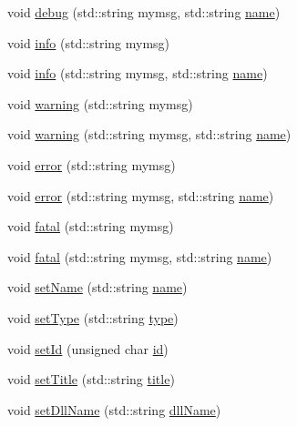 \begin{DoxyCompactItemize}
\item 
void \hyperlink{classObject_a6c9a0397ca804e04d675ed05683f5420}{debug} (std\+::string mymsg, std\+::string \hyperlink{classObject_a300f4c05dd468c7bb8b3c968868443c1}{name})
\item 
void \hyperlink{classObject_a644fd329ea4cb85f54fa6846484b84a8}{info} (std\+::string mymsg)
\item 
void \hyperlink{classObject_a1ca123253dfd30fc28b156f521dcbdae}{info} (std\+::string mymsg, std\+::string \hyperlink{classObject_a300f4c05dd468c7bb8b3c968868443c1}{name})
\item 
void \hyperlink{classObject_a65cd4fda577711660821fd2cd5a3b4c9}{warning} (std\+::string mymsg)
\item 
void \hyperlink{classObject_a11f101db4dd73d9391b0231818881d86}{warning} (std\+::string mymsg, std\+::string \hyperlink{classObject_a300f4c05dd468c7bb8b3c968868443c1}{name})
\item 
void \hyperlink{classObject_a204a95f57818c0f811933917a30eff45}{error} (std\+::string mymsg)
\item 
void \hyperlink{classObject_ad7f6c457733082efa2f9ff5f5c8e119a}{error} (std\+::string mymsg, std\+::string \hyperlink{classObject_a300f4c05dd468c7bb8b3c968868443c1}{name})
\item 
void \hyperlink{classObject_aad5a16aac7516ce65bd5ec02ab07fc80}{fatal} (std\+::string mymsg)
\item 
void \hyperlink{classObject_ae62acd3d09f716220f75f252dc38bc9a}{fatal} (std\+::string mymsg, std\+::string \hyperlink{classObject_a300f4c05dd468c7bb8b3c968868443c1}{name})
\item 
void \hyperlink{classObject_ae30fea75683c2d149b6b6d17c09ecd0c}{set\+Name} (std\+::string \hyperlink{classObject_a300f4c05dd468c7bb8b3c968868443c1}{name})
\item 
void \hyperlink{classObject_aae534cc9d982bcb9b99fd505f2e103a5}{set\+Type} (std\+::string \hyperlink{classObject_a84f99f70f144a83e1582d1d0f84e4e62}{type})
\item 
void \hyperlink{classObject_a398fe08cba594a0ce6891d59fe4f159f}{set\+Id} (unsigned char \hyperlink{classObject_af99145335cc61ff6e2798ea17db009d2}{id})
\item 
void \hyperlink{classObject_a89557dbbad5bcaa02652f5d7fa35d20f}{set\+Title} (std\+::string \hyperlink{classObject_a73a0f1a41828fdd8303dd662446fb6c3}{title})
\item 
void \hyperlink{classObject_a870c5af919958c2136623b2d7816d123}{set\+Dll\+Name} (std\+::string \hyperlink{classObject_a2e3947f2870094c332d7454117f3ec63}{dll\+Name})

\end{DoxyCompactItemize}
